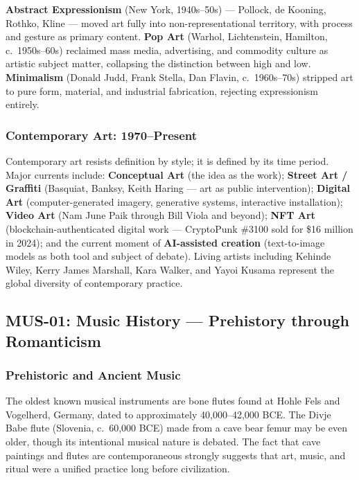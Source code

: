 \documentclass[11pt,letterpaper]{article}
\begin{document}
\textbf{Abstract Expressionism} (New York, 1940s--50s) --- Pollock, de Kooning, Rothko, Kline --- moved art fully into non-representational territory, with process and gesture as primary content. \textbf{Pop Art} (Warhol, Lichtenstein, Hamilton, c.~1950s--60s) reclaimed mass media, advertising, and commodity culture as artistic subject matter, collapsing the distinction between high and low. \textbf{Minimalism} (Donald Judd, Frank Stella, Dan Flavin, c.~1960s--70s) stripped art to pure form, material, and industrial fabrication, rejecting expressionism entirely.

\subsubsection{Contemporary Art: 1970--Present}

Contemporary art resists definition by style; it is defined by its time period. Major currents include: \textbf{Conceptual Art} (the idea as the work); \textbf{Street Art / Graffiti} (Basquiat, Banksy, Keith Haring --- art as public intervention); \textbf{Digital Art} (computer-generated imagery, generative systems, interactive installation); \textbf{Video Art} (Nam June Paik through Bill Viola and beyond); \textbf{NFT Art} (blockchain-authenticated digital work --- CryptoPunk \#3100 sold for \$16 million in 2024); and the current moment of \textbf{AI-assisted creation} (text-to-image models as both tool and subject of debate). Living artists including Kehinde Wiley, Kerry James Marshall, Kara Walker, and Yayoi Kusama represent the global diversity of contemporary practice.

\subsection{MUS-01: Music History --- Prehistory through Romanticism}

\subsubsection{Prehistoric and Ancient Music}

The oldest known musical instruments are bone flutes found at Hohle Fels and Vogelherd, Germany, dated to approximately 40,000--42,000 BCE. The Divje Babe flute (Slovenia, c.~60,000 BCE) made from a cave bear femur may be even older, though its intentional musical nature is debated. The fact that cave paintings and flutes are contemporaneous strongly suggests that art, music, and ritual were a unified practice long before civilization.
\end{document}
